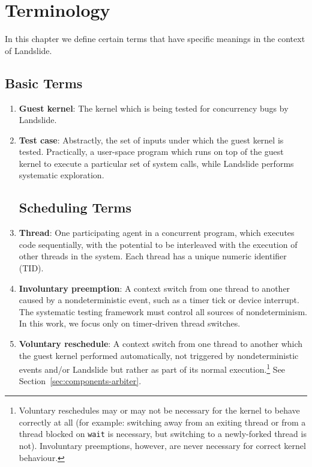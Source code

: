 \chapter{Terminology}
\label{sec:terminology}

In this chapter we define certain terms that have specific meanings in the context of Landslide.

\section{Basic Terms}

\begin{enumerate}
	\item {\bf Guest kernel}:
		The kernel which is being tested for concurrency bugs by Landslide.
	\item {\bf Test case}:
		Abstractly, the set of inputs under which the guest kernel is tested. Practically, a user-space program which runs on top of the guest kernel to execute a particular set of system calls, while Landslide performs systematic exploration.

\section{Scheduling Terms}


	\item {\bf Thread}:
		One participating agent in a concurrent program, which executes code sequentially, with the potential to be interleaved with the execution of other threads in the system.
		Each thread has a unique numeric identifier (TID).
	\item {\bf Involuntary preemption}:
		A context switch from one thread to another caused by a nondeterministic event, such as a timer tick or device interrupt. The systematic testing framework must control all sources of nondeterminism. In this work, we focus only on timer-driven thread switches.
	\item {\bf Voluntary reschedule}:
		A context switch from one thread to another which the guest kernel performed automatically, not triggered by nondeterministic events and/or Landslide but rather as part of its normal execution.\footnote{
		Voluntary reschedules may or may not be necessary for the kernel to behave correctly at all (for example: switching away from an exiting thread or from a thread blocked on \texttt{wait} is necessary, but switching to a newly-forked thread is not). Involuntary preemptions, however, are never necessary for correct kernel behaviour.}
		See Section~\ref{sec:components-arbiter}.


\end{enumerate}
